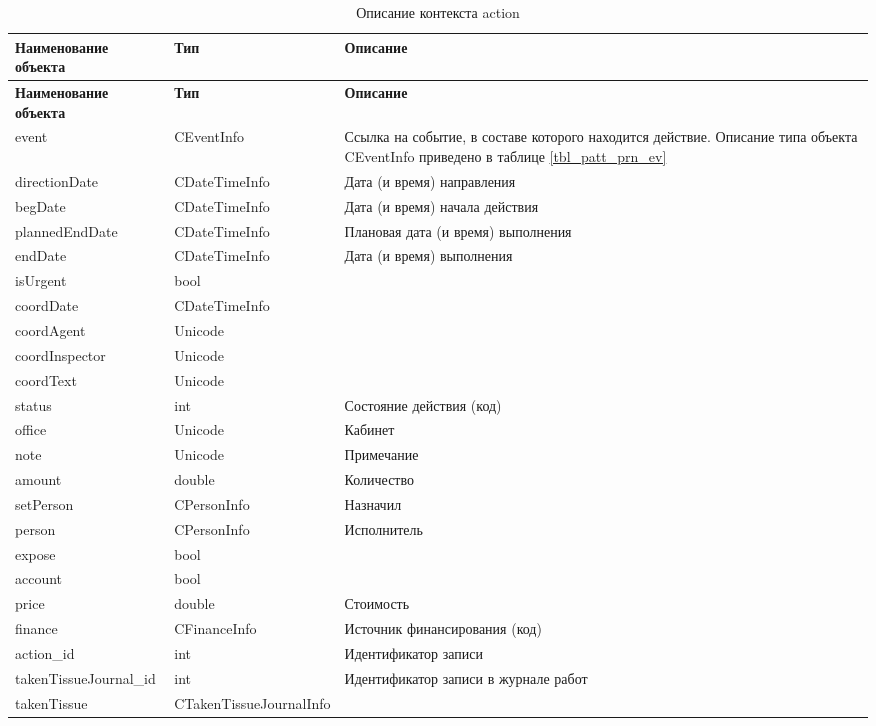 {\small
\begin{longtable}{|p{4.1cm}|p{5cm}|p{7.5cm}|}
\caption{Описание контекста action \label{tbl_patt_prn_act}} \\
\hline \rule{0pt}{15pt} \centering \textbf{Наименование объекта} & \centering \textbf{Тип} & \hfil \textbf{Описание} \\ \hline
\endfirsthead
\hline \rule{0pt}{15pt} \centering \textbf{Наименование объекта} & \centering \textbf{Тип} & \hfil \textbf{Описание} \\ \hline
\endhead
event &	CEventInfo	& Ссылка на событие, в составе которого находится действие. Описание типа объекта CEventInfo приведено в таблице \ref{tbl_patt_prn_ev} \\ \hline
directionDate	& CDateTimeInfo	& Дата (и время) направления \\ \hline
begDate	& CDateTimeInfo	& Дата (и время) начала действия \\ \hline
plannedEndDate	& CDateTimeInfo	& Плановая дата (и время) выполнения \\ \hline
endDate	& CDateTimeInfo &	Дата (и время) выполнения \\ \hline
isUrgent & 	bool	& \\ \hline
coordDate	& CDateTimeInfo & \\ \hline	
coordAgent	& Unicode	&  \\ \hline
coordInspector	& Unicode & \\ \hline	
coordText	& Unicode	&  \\ \hline
status	& int	& Состояние действия (код) \\ \hline
office	& Unicode	& Кабинет \\ \hline
note	& Unicode	& Примечание \\ \hline
amount	& double	& Количество \\ \hline
setPerson	& CPersonInfo	& Назначил \\ \hline
person	& CPersonInfo	& Исполнитель \\ \hline
expose	& bool &  \\ \hline	
account	& bool &  \\ \hline	
price	& double &	Стоимость \\ \hline
finance	& CFinanceInfo	& Источник финансирования (код) \\ \hline
action\_id	& int	& Идентификатор записи \\ \hline
takenTissueJournal\_id	& int	& Идентификатор записи в журнале работ \\ \hline
takenTissue	& CTakenTissueJournalInfo	&  \\ \hline
\end{longtable}
}


